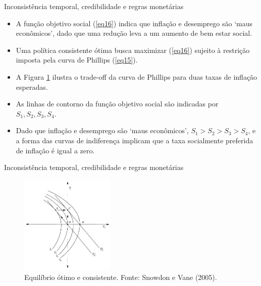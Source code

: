 \documentclass[10pt]{beamer}
\begin{document}
\begin{frame}{Inconsistência temporal, credibilidade e regras monetárias}
    \begin{itemize}
        \item A função objetivo social (\ref{eq16}) indica que inflação e desemprego são `maus econômicos', dado que uma redução leva a um aumento de bem estar social.
        \bigskip
        \item Uma política consistente ótima busca maximizar (\ref{eq16}) sujeito à restrição imposta pela curva de Phillips (\ref{eq15}).
        \bigskip
        \item A Figura \ref{fig2} ilustra o trade-off da curva de Phillips para duas taxas de inflação esperadas.
        \bigskip
        \item As linhas de contorno da função objetivo social são indicadas por $S_1, S_2, S_3, S_4$.
        \bigskip
        \item Dado que inflação e desemprego são `maus econômicos', $S_1>S_2>S_3>S_4$, e a forma das curvas de indiferença implicam que a taxa socialmente preferida de inflação é igual a zero.
    \end{itemize}
\end{frame}

\begin{frame}{Inconsistência temporal, credibilidade e regras monetárias}
    \begin{figure}
        \centering
        \includegraphics[width=0.4\textwidth]{./figures/aula12_fig2.PNG}
        \caption{Equilíbrio ótimo e consistente. Fonte: Snowdon e Vane (2005).}
        \label{fig2}
    \end{figure}
\end{frame}
\end{document}
